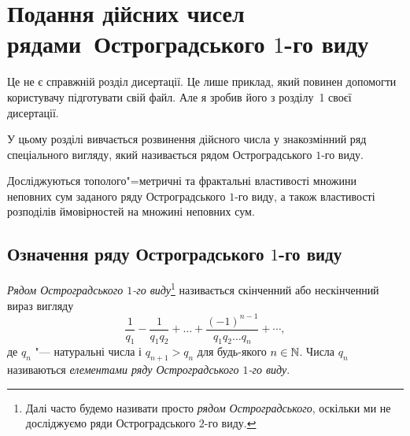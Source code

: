 \chapter{Подання дійсних чисел рядами~Остроградського $1$-го виду}
\label{ch:o1series}

Це не є справжній розділ дисертації. Це лише приклад, який повинен
допомогти користувачу підготувати свій файл. Але я зробив його з
розділу~1 своєї дисертації.

У цьому розділі вивчається розвинення дійсного числа у
знакозмінний ряд спеціального вигляду, який називається рядом
Остроградського $1$-го виду.

Досліджуються тополого"=метричні та фрактальні властивості множини
неповних сум заданого ряду Остроградського $1$-го виду, а також
властивості розподілів ймовірностей на множині неповних сум.


\section{Означення ряду Остроградського $1$-го виду}

\begin{definition}
\emph{Рядом Остроградського $1$-го виду}\footnote{Далі часто
будемо називати просто \emph{рядом Остроградського}, оскільки ми
не досліджуємо ряди Остроградського $2$-го виду.} називається
скінченний або нескінченний вираз вигляду
\begin{equation}\label{eq:o1series}
\frac1{q_1}-\frac1{q_1q_2}+\dots +\frac{(-1)^{n-1}}{q_1q_2\dots
q_n}+\dotsb,
\end{equation}
де $q_n$ "--- натуральні числа і $q_{n + 1}>q_n$ для будь-якого
$n\in\mathbb{N}$. Числа $q_n$ називаються \emph{елементами ряду
Остроградського $1$-го виду}.
\end{definition}

